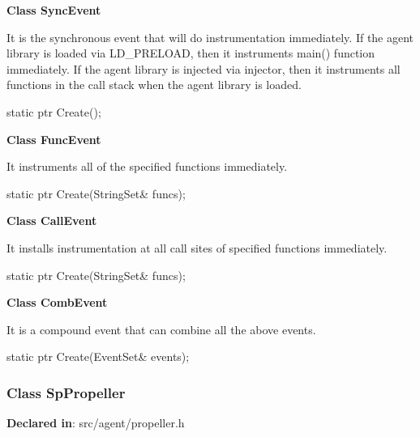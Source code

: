 \textbf{Class SyncEvent}

It is the synchronous event that will do instrumentation immediately.
If the agent library is loaded via LD\_PRELOAD, then it instruments main()
function immediately.
If the agent library is injected via injector, then it instruments all functions
in the call stack when the agent library is loaded.

\begin{apient}
static ptr Create();
\end{apient}


\textbf{Class FuncEvent}

It instruments all of the specified functions immediately.

\begin{apient}
static ptr Create(StringSet& funcs);
\end{apient}

\textbf{Class CallEvent}

It installs instrumentation at all call sites of specified functions immediately.

\begin{apient}
static ptr Create(StringSet& funcs);
\end{apient}

\textbf{Class CombEvent}

It is a compound event that can combine all the above events.

\begin{apient}
static ptr Create(EventSet& events);
\end{apient}

\subsubsection{Class SpPropeller}
\textbf{Declared in}: src/agent/propeller.h

